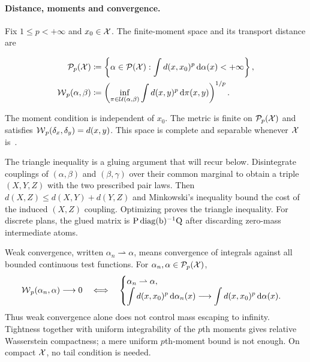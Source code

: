 \paragraph{Distance, moments and convergence.}
Fix $1\leq p<+\infty$ and $x_0\in\mathcal{X}$. The finite-moment space and its transport distance are
\begin{defn}\label{def-wasserstein-distance}
\begin{align}
  \mathcal{P}_p(\mathcal{X})&\coloneqq\left\{\alpha\in\mathcal{P}(\mathcal{X}):\int d(x,x_0)^p\,\mathrm{d}\alpha(x)<+\infty\right\},
  \label{eq-primer-p-moment-space}\\
  \operatorname{\mathcal{W}}_p(\alpha,\beta)&\coloneqq
  \left(\inf_{\pi\in\mathcal{U}(\alpha,\beta)}\int d(x,y)^p\,\mathrm{d}\pi(x,y)\right)^{1/p}.
  \label{eq-kantorovich-wasserstein}
\end{align}
\end{defn}
The moment condition is independent of $x_0$. The metric is finite on $\mathcal{P}_p(\mathcal{X})$ and satisfies $\operatorname{\mathcal{W}}_p(\delta_x,\delta_y)=d(x,y)$. This space is complete and separable whenever $\mathcal{X}$ is~\citep{Villani09,ambrosio2006gradient}.

The triangle inequality is a gluing argument that will recur below. Disintegrate couplings of $(\alpha,\beta)$ and $(\beta,\gamma)$ over their common marginal to obtain a triple $(X,Y,Z)$ with the two prescribed pair laws. Then $d(X,Z)\leq d(X,Y)+d(Y,Z)$ and Minkowski's inequality bound the cost of the induced $(X,Z)$ coupling. Optimizing proves the triangle inequality. For discrete plans, the glued matrix is $\mathrm{P}\operatorname{diag}(\mathrm{b})^{-1}\mathrm{Q}$ after discarding zero-mass intermediate atoms.

Weak convergence, written $\alpha_n\rightharpoonup\alpha$, means convergence of integrals against all bounded continuous test functions. For $\alpha_n,\alpha\in\mathcal{P}_p(\mathcal{X})$,
\begin{equation}\label{eq-primer-wasserstein-convergence}
  \operatorname{\mathcal{W}}_p(\alpha_n,\alpha)\longrightarrow0
  \quad\Longleftrightarrow\quad
  \begin{cases}
    \alpha_n\rightharpoonup\alpha,\\
    \displaystyle\int d(x,x_0)^p\,\mathrm{d}\alpha_n(x)
    \longrightarrow\int d(x,x_0)^p\,\mathrm{d}\alpha(x).
  \end{cases}
\end{equation}
Thus weak convergence alone does not control mass escaping to infinity. Tightness together with uniform integrability of the $p$th moments gives relative Wasserstein compactness; a mere uniform $p$th-moment bound is not enough. On compact $\mathcal{X}$, no tail condition is needed.

